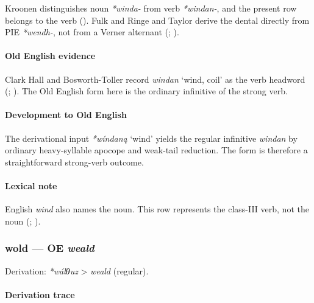 \documentclass[
  british,
  a4paper,
]{article}
\providecommand{\Recon}[1]{\emph{*#1}}
\begin{document}
Kroonen distinguishes noun \emph{*winda-} from verb \emph{*windan-}, and
the present row belongs to the verb (). Fulk and Ringe and Taylor derive the dental directly from PIE
\emph{*wendh-}, not from a Verner alternant
(;
).

\paragraph{Old English evidence}\label{old-english-evidence-82}

Clark Hall and Bosworth-Toller record {\emph{windan}} `wind, coil' as
the verb headword (;
). The
Old English form here is the ordinary infinitive of the strong verb.

\paragraph{Development to Old
English}\label{development-to-old-english-81}

The derivational input \Recon{wíndaną} `wind' yields the regular
infinitive \emph{windan} by ordinary heavy-syllable apocope and
weak-tail reduction. The form is therefore a straightforward strong-verb
outcome.

\paragraph{Lexical note}\label{lexical-note-5}

English \emph{wind} also names the noun. This row represents the
class-III verb, not the noun (;
).

\subsubsection{\texorpdfstring{wold --- OE
\emph{weald}}{wold --- OE weald}}\label{wold-oe-weald}

Derivation: \emph{*wálθuz} \textgreater{} \emph{weald} (regular).

\paragraph{Derivation trace}\label{derivation-trace-101}
\end{document}
